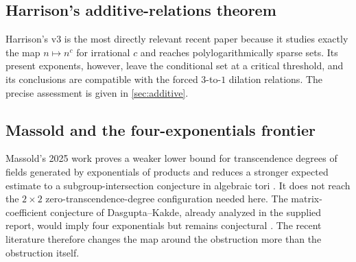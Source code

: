 \documentclass[11pt,oneside]{article}
\theoremstyle{definition}
\theoremstyle{remark}
\begin{document}
\subsection{Harrison's additive-relations theorem}

Harrison's v3 is the most directly relevant recent paper because it studies exactly the map $n\mapsto n^c$ for irrational $c$ and reaches polylogarithmically sparse sets.  Its present exponents, however, leave the conditional set at a critical threshold, and its conclusions are compatible with the forced $3$-to-$1$ dilation relations.  The precise assessment is given in \cref{sec:additive}.

\subsection{Massold and the four-exponentials frontier}

Massold's 2025 work proves a weaker lower bound for transcendence degrees of fields generated by exponentials of products and reduces a stronger expected estimate to a subgroup-intersection conjecture in algebraic tori \cite{Massold2025}.  It does not reach the $2\times2$ zero-transcendence-degree configuration needed here.  The matrix-coefficient conjecture of Dasgupta--Kakde, already analyzed in the supplied report, would imply four exponentials but remains conjectural \cite{DasguptaKakde2024}.  The recent literature therefore changes the map around the obstruction more than the obstruction itself.
\end{document}

